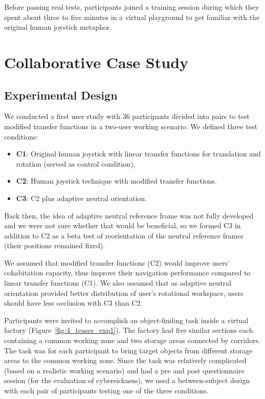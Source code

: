 Before passing real tests, participants joined a training session during which they spent about three to five minutes in a virtual playground to get familiar with the original human joystick metaphor.




\section{Collaborative Case Study}
\subsection{Experimental Design}
We conducted a first user study \citep{Chen2015Cohab} with 36 participants divided into pairs to test modified transfer functions in a two-user working scenario. We defined three test conditions:

\begin{itemize}
  \item \textbf{C1}: Original human joystick with linear transfer functions for translation and rotation (served as control condition).
  \item \textbf{C2}: Human joystick technique with modified transfer functions.
  \item \textbf{C3}: C2 plus adaptive neutral orientation.
\end{itemize}

Back then, the idea of adaptive neutral reference frame was not fully developed and we were not sure whether that would be beneficial, so we formed C3 in addition to C2 as a beta test of reorientation of the neutral reference frames (their positions remained fixed).

We assumed that modified transfer functions (C2) would improve users' cohabitation capacity, thus improve their navigation performance compared to linear transfer functions (C1). We also assumed that as adaptive neutral orientation provided better distribution of user's rotational workspace, users should have less occlusion with C3 than C2.

Participants were invited to accomplish an object-finding task inside a virtual factory (Figure~\ref{fig:4_teaser_exp1}). The factory had five similar sections each containing a common working zone and two storage areas connected by corridors. The task was for each participant to bring target objects from different storage areas to the common working zone. Since the task was relatively complicated (based on a realistic working scenario) and had a pre and post questionnaire session (for the evaluation of cybersickness), we used a between-subject design with each pair of participants testing one of the three conditions.

